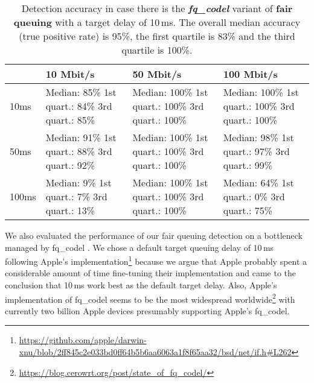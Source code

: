 \documentclass[conference]{IEEEtran}
\begin{document}
\begin{table}
\begin{tabularx}{\columnwidth}{| l | X | X | X |}
\hline
& 10 Mbit/s & 50 Mbit/s & 100 Mbit/s \\ \hline
10ms & Median: 85\% \newline 1st quart.: 84\% \newline 3rd quart.: 85\% & Median: 100\% \newline 1st quart.: 100\% \newline 3rd quart.: 100\% & Median: 100\% \newline 1st quart.: 100\% \newline 3rd quart.: 100\%\\ \hline
50ms & Median: 91\% \newline 1st quart.: 88\% \newline 3rd quart.: 92\% & Median: 100\% \newline 1st quart.: 100\% \newline 3rd quart.: 100\% & Median: 98\% \newline 1st quart.: 97\% \newline 3rd quart.: 99\% \\ \hline
100ms & Median: 9\% \newline 1st quart.: 7\% \newline 3rd quart.: 13\% & Median: 100\% \newline 1st quart.: 100\% \newline 3rd quart.: 100\% & Median: 64\% \newline 1st quart.: 0\% \newline 3rd quart.: 75\% \\ \hline
\end{tabularx}
\caption{Detection accuracy in case there is the \textbf{\textit{fq\_codel}} variant of \textbf{fair queuing} with a target delay of 10\,ms. The overall median accuracy (true positive rate) is 95\%, the first quartile is 83\% and the third quartile is 100\%.}
\label{table:fq_codel}
\end{table}        

We also evaluated the performance of our fair queuing detection on a bottleneck managed by fq\_codel \cite{hoeiland-joergensen_flow_2018}. 
We chose a default target queuing delay of 10\,ms following Apple's implementation\footnote{
    \url{https://github.com/apple/darwin-xnu/blob/2ff845c2e033bd0ff64b5b6aa6063a1f8f65aa32/bsd/net/if.h\#L262}
} because we argue that Apple probably spent a considerable amount of time fine-tuning their implementation and 
came to the conclusion that 10\,ms work best as the default target delay. 
Also, Apple's implementation of fq\_codel seems to be the most widespread worldwide\footnote{\url{https://blog.cerowrt.org/post/state_of_fq_codel/}} with currently two billion Apple devices presumably supporting Apple's fq\_codel. 
\end{document}
